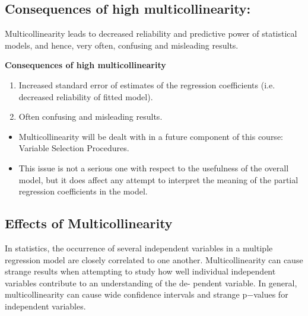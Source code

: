 \documentclass[a4paper,12pt]{article}
\begin{document}
\subsection{Consequences of high multicollinearity:}
Multicollinearity leads to decreased reliability and predictive power of statistical models, and hence, very
often, confusing and misleading results.

\textbf{Consequences of high multicollinearity}\\
\begin{enumerate}
	\item Increased standard error of estimates of the regression coefficients (i.e. decreased reliability of fitted
	model).
	\item Often confusing and misleading results.
\end{enumerate}

\begin{itemize}
	\item  Multicollinearity will be dealt with in a future component of this course: Variable Selection Procedures.
	\item  This issue is not a serious one with respect to the usefulness of the overall model, but it does affect any attempt to interpret the meaning of the partial regression coefficients in the model.

\end{itemize}
\textbf{}
\subsection{Effects of Multicollinearity}

In statistics, the occurrence of several independent variables in a multiple regression model are
closely correlated to one another. Multicollinearity can cause strange results when attempting
to study how well individual independent variables contribute to an understanding of the de-
pendent variable. In general, multicollinearity can cause wide confidence intervals and strange
p−values for independent variables.
\end{document}
